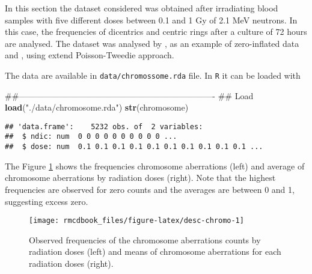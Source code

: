 \documentclass[9pt,a5paper,]{book}
\newenvironment{Shaded}{}{}
\newcommand{\KeywordTok}[1]{\textbf{{#1}}}
\newcommand{\StringTok}[1]{{#1}}
\newcommand{\NormalTok}[1]{{#1}}
\renewenvironment{Shaded}{\color{inputcolor}}{}
\theoremstyle{definition}
\theoremstyle{definition}
\theoremstyle{remark}
\begin{document}
In this section the dataset considered was obtained after irradiating
blood samples with five different doses between 0.1 and 1 Gy of 2.1 MeV
neutrons. In this case, the frequencies of dicentrics and centric rings
after a culture of 72 hours are analysed. The dataset was analysed by
\citet{Oliveira2006}, as an example of zero-inflated data and
\citet{Bonat2016b}, using extend Poisson-Tweedie approach.

The data are available in \texttt{data/chromossome.rda} file. In
\texttt{R} it can be loaded with

\begin{Shaded}
\begin{Highlighting}[]
\NormalTok{##----------------------------------------------------------------------}
\NormalTok{## Load}
\KeywordTok{load}\NormalTok{(}\StringTok{"./data/chromosome.rda"}\NormalTok{)}
\KeywordTok{str}\NormalTok{(chromosome)}
\end{Highlighting}
\end{Shaded}

\begin{verbatim}
## 'data.frame':    5232 obs. of  2 variables:
##  $ ndic: num  0 0 0 0 0 0 0 0 0 0 ...
##  $ dose: num  0.1 0.1 0.1 0.1 0.1 0.1 0.1 0.1 0.1 0.1 ...
\end{verbatim}

The Figure \ref{fig:desc-chromo} shows the frequencies chromosome
aberrations (left) and average of chromosome aberrations by radiation
doses (right). Note that the highest frequencies are observed for zero
counts and the averages are between 0 and 1, suggesting excess zero.

\begin{figure}[h]

{\centering \texttt{[image: rmcdbook\_files/figure-latex/desc-chromo-1]} 

}

\caption{Observed frequencies of the chromosome aberrations counts by radiation doses (left) and means of chromosome aberrations for each radiation doses (right).}\label{fig:desc-chromo}
\end{figure}
\end{document}
